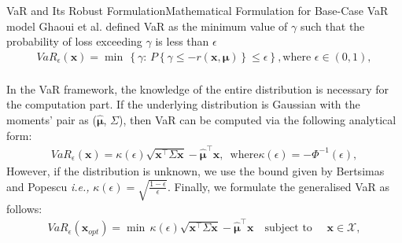\documentclass{beamer}
\begin{document}
\begin{frame}{VaR and Its Robust Formulation}{Mathematical Formulation for Base-Case VaR model}
Ghaoui et al. defined VaR as the minimum value
of $\gamma$ such that the probability of loss exceeding $\gamma$ is less than $\epsilon$
\begin{equation}
\begin{split}
VaR_\epsilon(\mathbf{x}) = \min \, \left\{ \gamma :  \, P\left\{\gamma \leq -r(\mathbf{x},\boldsymbol{\mu})\right\} \leq \epsilon \right\}, \text{where } \epsilon \in (0,1), \\
\end{split}
\label{fig:var_basic}
\end{equation}

In the VaR framework, the knowledge of the entire distribution is necessary for the computation part. If the underlying distribution is Gaussian with the moments' pair as ($\hat{\boldsymbol{\mu}}$, $\Sigma$), then VaR can be computed via the following analytical form:
\begin{equation}
\begin{split}
VaR_\epsilon(\mathbf{x}) = \kappa(\epsilon)\sqrt{\mathbf{x}^{\top}\Sigma \mathbf{x}} - \hat{\boldsymbol{\mu}}^{\top}\mathbf{x}, \, \text{  where} \kappa(\epsilon) = -\Phi^{-1}(\epsilon),
\end{split}
\label{eqn:kappa_eqn}
\end{equation}
However, if the distribution is unknown, we use the bound given by Bertsimas and Popescu \cite{bertsimas05} \textit{i.e.,} $\displaystyle{ \kappa(\epsilon) = \sqrt{\frac{1-\epsilon}{\epsilon}}}$. Finally, we formulate the generalised VaR as follows:
\begin{equation}
\begin{split}
VaR_\epsilon(\mathbf{x}_{opt}) = \min \, \kappa(\epsilon)\sqrt{\mathbf{x}^{\top}\Sigma \mathbf{x}} - \hat{\boldsymbol{\mu}}^{\top}\mathbf{x} \quad \text{subject to } \quad \mathbf{x} \in \mathcal{X},
\end{split}
\label{fig:var_general}
\end{equation}
\end{frame}
\end{document}
